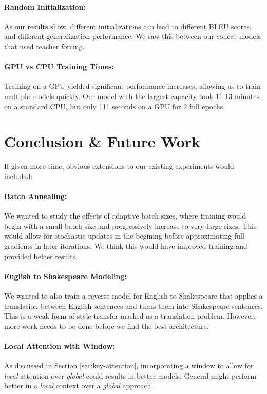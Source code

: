 \documentclass[twoside,twocolumn]{article}
\begin{document}
\paragraph{Random Initialization:}
As our results show, different initializations can lead to different BLEU
scores, and different generalization performance. We saw this between our
concat models that used teacher forcing.
\paragraph{GPU vs CPU Training Times:}
Training on a GPU yielded significant performance increases, allowing us to
train multiple models quickly. Our model with the largest capacity took 11-13
minutes on a standard CPU, but only 111 seconds on a GPU for 2 full epochs.
\section{Conclusion \& Future Work}
\label{sec:conclusion}
If given more time, obvious extensions to our existing experiments would
included:
\paragraph{Batch Annealing:}
We wanted to study the effects of adaptive batch sizes,
where training would
begin with a small batch size and progressively increase to very large sizes.
This would allow for stochastic updates in the begining before approximating
full gradients in later iterations. We think this would have improved
training and provided better results.
\paragraph{English to Shakespeare Modeling:} We wanted to also train a reverse
model for English to Shakespeare that applies
a translation between English sentences and turns them into Shakespeare sentences.
This is a weak form of style transfer masked as a translation problem.
However, more work needs to be done before we find the best architecture.
\paragraph{Local Attention with Window:} As discussed in Section
\ref{sec:key-attention}, incorporating a window to allow
for \emph{local} attention over \emph{global} could results in better
models. General might perform better in a \emph{local} context over a
\emph{global} approach.
\end{document}
